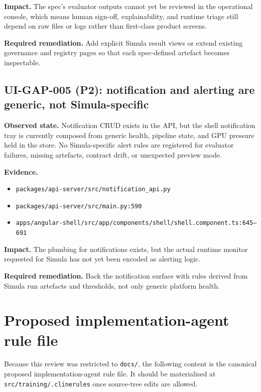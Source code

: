 \documentclass[12pt,a4paper,twoside]{report}
\begin{document}
\textbf{Impact.}
The spec's evaluator outputs cannot yet be reviewed in the operational
console, which means human sign-off, explainability, and runtime
triage still depend on raw files or logs rather than first-class
product screens.

\textbf{Required remediation.}
Add explicit Simula result views or extend existing governance and
registry pages so that each spec-defined artefact becomes inspectable.

\subsection*{UI-GAP-005 (P2): notification and alerting are generic, not Simula-specific}
\textbf{Observed state.}
Notification CRUD exists in the API, but the shell notification tray
is currently composed from generic health, pipeline state, and GPU
pressure held in the store. No Simula-specific alert rules are
registered for evaluator failures, missing artefacts, contract drift,
or unexpected preview mode.

\textbf{Evidence.}
\begin{itemize}
\item \texttt{packages/api-server/src/notification\_api.py}
\item \texttt{packages/api-server/src/main.py:590}
\item \texttt{apps/angular-shell/src/app/components/shell/shell.component.ts:645--691}
\end{itemize}

\textbf{Impact.}
The plumbing for notifications exists, but the actual runtime monitor
requested for Simula has not yet been encoded as alerting logic.

\textbf{Required remediation.}
Back the notification surface with rules derived from Simula run
artefacts and thresholds, not only generic platform health.

\section{Proposed implementation-agent rule file}
\label{sec:simula-proposed-clinerules}
Because this review was
restricted to \texttt{docs/}, the following content is the canonical
proposed implementation-agent rule file. It should be materialised at
\texttt{src/training/.clinerules} once source-tree edits are allowed.
\end{document}
